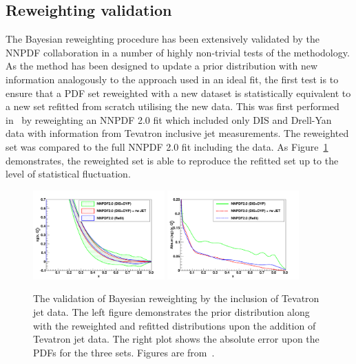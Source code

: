 \subsection{Reweighting validation}
The Bayesian reweighting procedure has been extensively validated by the NNPDF collaboration in a number of highly non-trivial tests of the methodology. As the method has been designed to update a prior distribution with new information analogously to the approach used in an ideal fit, the first test is to ensure that a PDF set reweighted with a new dataset is statistically equivalent to a new set refitted from scratch utilising the new data. This was first performed in~\cite{Ball:2010gb} by reweighting an NNPDF 2.0 fit which included only DIS and Drell-Yan data with information from Tevatron inclusive jet measurements. The reweighted set was compared to the full NNPDF 2.0 fit including the data. As Figure~\ref{fig:rwvalid} demonstrates, the reweighted set is able to reproduce the refitted set up to the level of statistical fluctuation.
\clearpage
\begin{figure}[ht!]
\centering
\includegraphics[width=0.45\textwidth]{4-LHCtools/figs/jets-t0-xg_Q2_2_lin.pdf}
\includegraphics[width=0.45\textwidth]{4-LHCtools/figs/jets-t0-abserror-xg_Q2_2_lin.pdf}
\caption[Validation of Bayesian reweighting by the inclusion of Tevatron jet data]{The validation of Bayesian reweighting by the inclusion of Tevatron jet data. The left figure demonstrates the prior distribution along with the reweighted and refitted distributions upon the addition of Tevatron jet data. The right plot shows the absolute error upon the PDFs for the three sets. Figures are from~\cite{Ball:2010gb}.}
\label{fig:rwvalid}
\end{figure}


